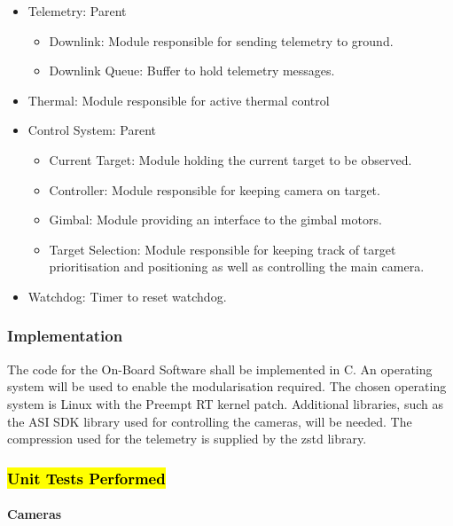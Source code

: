 \begin{itemize}
	\item Telemetry: Parent
		\begin{itemize}
			\item Downlink: Module responsible for sending telemetry to ground.
			\item Downlink Queue: Buffer to hold telemetry messages.
		\end{itemize}

	\item Thermal: Module responsible for active thermal control

	\item Control System: Parent
		\begin{itemize}
			\item Current Target: Module holding the current target to be observed.
			\item Controller: Module responsible for keeping camera on target.
			\item Gimbal: Module providing an interface to the gimbal motors.
			\item Target Selection: Module responsible for keeping track of target prioritisation and positioning as well as controlling the main camera.
		\end{itemize}

	\item Watchdog: Timer to reset watchdog.

\end{itemize}

\subsubsection{Implementation}

The code for the On-Board Software shall be implemented in C. An operating system will be used to enable the modularisation required. The chosen operating system is Linux with the Preempt RT kernel patch. Additional libraries, such as the ASI SDK library used for controlling the cameras, will be needed. The compression used for the telemetry is supplied by the zstd library.

\subsubsection{\hl{Unit Tests Performed}}

\paragraph{Cameras}

